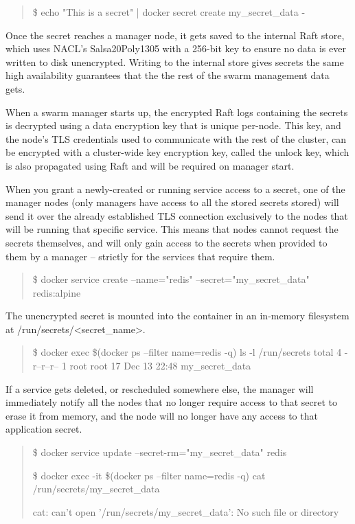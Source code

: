  
\begin{quote}
\$ echo "This is a secret" | docker secret create my\_secret\_data -
\end{quote}
 

Once the secret reaches a manager node, it gets saved to the internal Raft
store, which uses NACL’s Salsa20Poly1305 with a 256-bit key to ensure no
data is ever written to disk unencrypted. Writing to the internal store
gives secrets the same high availability guarantees that the the rest of
the swarm management data gets.

When a swarm manager starts up, the encrypted Raft logs containing the
secrets is decrypted using a data encryption key that is unique per-node.
This key, and the node’s TLS credentials used to communicate with the rest
of the cluster, can be encrypted with a cluster-wide key encryption key,
called the unlock key, which is also propagated using Raft and will be
required on manager start.

When you grant a newly-created or running service access to a secret, one
of the manager nodes (only managers have access to all the stored secrets
stored) will send it over the already established TLS connection
exclusively to the nodes that will be running that specific service. This
means that nodes cannot request the secrets themselves, and will only gain
access to the secrets when provided to them by a manager – strictly for the
services that require them.

\begin{quote}
\$ docker service  create --name="redis" --secret="my\_secret\_data" redis:alpine
\end{quote}
 

The  unencrypted secret is mounted into the container in an in-memory
filesystem at /run/secrets/<secret\_name>.

\begin{quote}
\$ docker exec \$(docker ps --filter name=redis -q) ls -l /run/secrets
total 4
-r--r--r--    1 root     root            17 Dec 13 22:48 my\_secret\_data
\end{quote}
 

If a service gets deleted, or rescheduled somewhere else, the manager will
immediately notify all the nodes that no longer require access to that
secret to erase it from memory, and the node will no longer have any access
to that application secret.

\begin{quote}
\$ docker service update --secret-rm="my\_secret\_data" redis

\$ docker exec -it \$(docker ps --filter name=redis -q) cat /run/secrets/my\_secret\_data

cat: can't open '/run/secrets/my\_secret\_data': No such file or directory
\end{quote}


